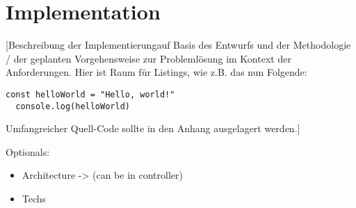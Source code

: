 \chapter{Implementation}

[Beschreibung der Implementierung\footnotemark auf Basis des Entwurfs und der Methodologie / der geplanten Vorgehensweise zur Probleml\"osung im Kontext der Anforderungen. Hier ist Raum f\"ur Listings, wie z.B. das nun Folgende:



\begin{lstlisting}[caption={Ein Beispiel: Hello World (JavaScript)}]
  const helloWorld = "Hello, world!"
  console.log(helloWorld)
\end{lstlisting}

Umfangreicher Quell-Code sollte in den Anhang ausgelagert werden.]





Optionals:
\begin{itemize}
  \item Architecture -> (can be in controller)
  \item Techs 
\end{itemize}